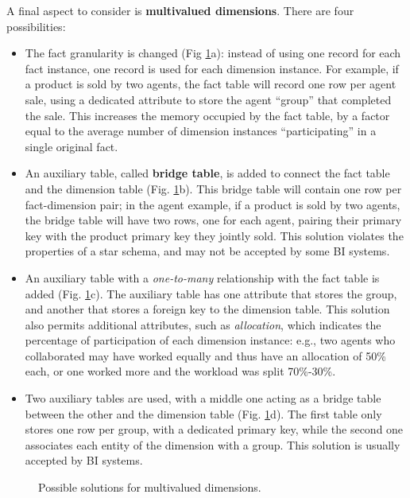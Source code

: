 A final aspect to consider is \textbf{multivalued dimensions}. There are four possibilities:
\begin{itemize}
    \item The fact granularity is changed (Fig \ref{fig:multivalued_dimensions}a): instead of using one record for each fact instance, one record is used for each dimension instance. For example, if a product is sold by two agents, the fact table will record one row per agent sale, using a dedicated attribute to store the agent ``group'' that completed the sale. This increases the memory occupied by the fact table, by a factor equal to the average number of dimension instances ``participating'' in a single original fact.
    \item An auxiliary table, called \textbf{bridge table}, is added to connect the fact table and the dimension table (Fig. \ref{fig:multivalued_dimensions}b). This bridge table will contain one row per fact-dimension pair; in the agent example, if a product is sold by two agents, the bridge table will have two rows, one for each agent, pairing their primary key with the product primary key they jointly sold. This solution violates the properties of a star schema, and may not be accepted by some BI systems.
    \item An auxiliary table with a \textit{one-to-many} relationship with the fact table is added (Fig. \ref{fig:multivalued_dimensions}c). The auxiliary table has one attribute that stores the group, and another that stores a foreign key to the dimension table. This solution also permits additional attributes, such as \textit{allocation}, which indicates the percentage of participation of each dimension instance: e.g., two agents who collaborated may have worked equally and thus have an allocation of 50\% each, or one worked more and the workload was split 70\%-30\%.
    \item Two auxiliary tables are used, with a middle one acting as a bridge table between the other and the dimension table (Fig. \ref{fig:multivalued_dimensions}d). The first table only stores one row per group, with a dedicated primary key, while the second one associates each entity of the dimension with a group. This solution is usually accepted by BI systems.
\end{itemize}

\begin{figure}[ht]
    \centering
    
    \caption{Possible solutions for multivalued dimensions.}
    \label{fig:multivalued_dimensions}
\end{figure}